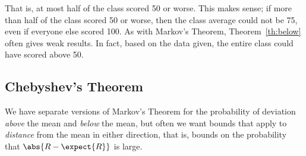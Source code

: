 That is, at most half of the class scored 50 or worse.  This makes
sense; if more than half of the class scored 50 or worse, then the
class average could not be 75, even if everyone else scored 100.
As with Markov's Theorem, Theorem~\ref{th:below} often gives weak
results.  In fact, based on the data given, the entire class could
have scored above 50.
\fi

\subsection{Chebyshev's Theorem}

We have separate versions of Markov's Theorem for the probability of
deviation \emph{above} the mean and \emph{below} the mean, but often we
want bounds that apply to \emph{distance} from the mean in either
direction, that is, bounds on the probability that $\abs{R - \expect{R}}$
is large.

